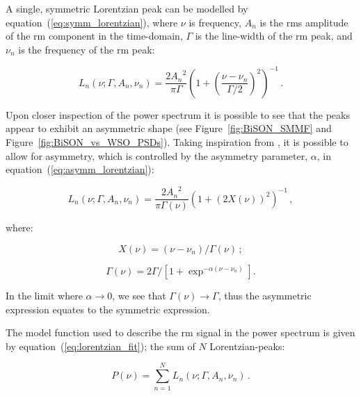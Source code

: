 A single, symmetric Lorentzian peak can be modelled by equation~(\ref{eq:symm_lorentzian}), where $\nu$ is frequency, $A_n$ is the \gls{rms} amplitude of the \gls{rm} component in the time-domain, $\Gamma$ is the line-width of the \gls{rm} peak, and $\nu_n$ is the frequency of the \gls{rm} peak:

\begin{equation}
L_n(\nu; \Gamma, A_n, \nu_n) = \frac{2{A_n}^2}{\pi \Gamma} \left(1 + \left(\frac{\nu - \nu_{n}}{\Gamma /2}\right)^2\right)^{-1} \, .
\label{eq:symm_lorentzian}
\end{equation}

Upon closer inspection of the power spectrum it is possible to see that the peaks appear to exhibit an asymmetric shape (see Figure~\ref{fig:BiSON_SMMF} and Figure~\ref{fig:BiSON_vs_WSO_PSDs}). Taking inspiration from \citet{howe_solar_2020}, it is possible to allow for asymmetry, which is controlled by the asymmetry parameter, $\alpha$, in equation~(\ref{eq:asymm_lorentzian}):

\begin{equation}
L_n(\nu; \Gamma, A_n, \nu_n) = \frac{2{A_n}^2}{\pi \Gamma(\nu)} \left(1 + \left(2X(\nu)\right)^2\right)^{-1} \, ,
\label{eq:asymm_lorentzian}
\end{equation}

where:

\begin{equation}
X(\nu) = (\nu - \nu_n)/\Gamma(\nu) \, ;
\label{eq:asymm_freq}
\end{equation}

\begin{equation}
\Gamma(\nu) = 2\Gamma / [1 + \exp^{-\alpha(\nu - \nu_n)}] .
\label{eq:asymm_width}
\end{equation}

In the limit where $\alpha \rightarrow 0$, we see that $\Gamma(\nu) \rightarrow \Gamma$, thus the asymmetric expression equates to the symmetric expression.

The model function used to describe the \gls{rm} signal in the power spectrum is given by equation~(\ref{eq:lorentzian_fit}); the sum of $N$ Lorentzian-peaks:

\begin{equation}
P(\nu) = \sum_{n=1}^{N} L_n(\nu; \Gamma, A_n, \nu_n) \, .
\label{eq:lorentzian_fit}
\end{equation}

